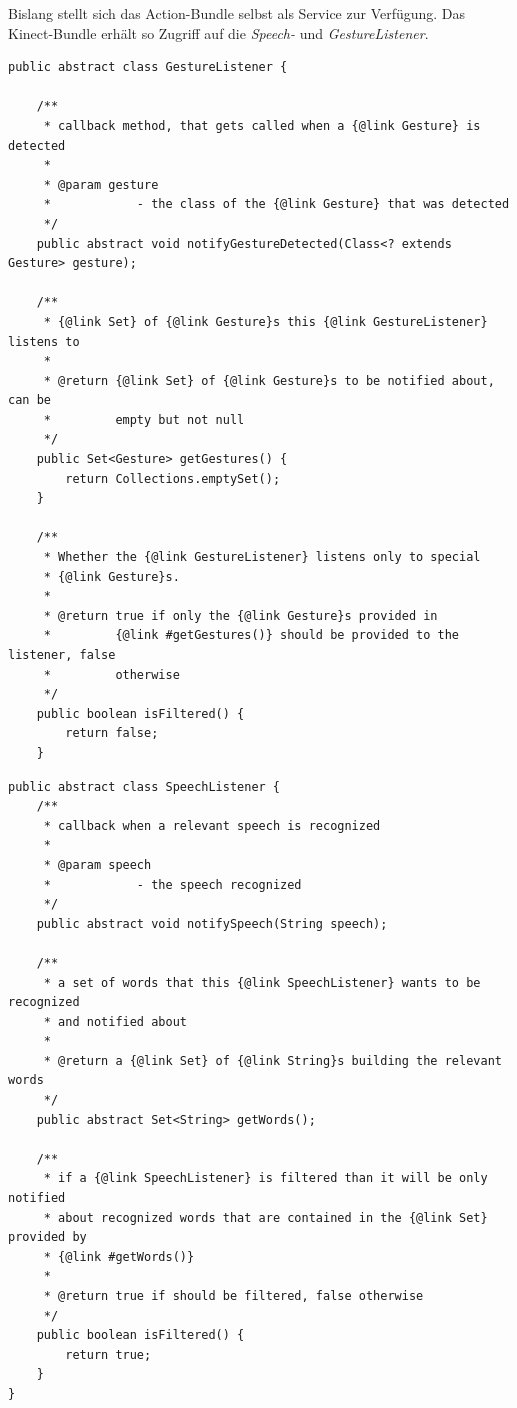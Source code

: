 Bislang stellt sich das Action-Bundle selbst als Service zur Verf\"ugung. Das Kinect-Bundle erh\"alt so Zugriff auf die \textit{Speech-} und 
\textit{GestureListener}.


\par\smallskip
\lstset{language=Java}

\begin{lstlisting}[caption={Klasse GestureListener}, label={listing:GestureListener}]
public abstract class GestureListener {

	/**
	 * callback method, that gets called when a {@link Gesture} is detected
	 * 
	 * @param gesture
	 *            - the class of the {@link Gesture} that was detected
	 */
	public abstract void notifyGestureDetected(Class<? extends Gesture> gesture);

	/**
	 * {@link Set} of {@link Gesture}s this {@link GestureListener} listens to
	 * 
	 * @return {@link Set} of {@link Gesture}s to be notified about, can be
	 *         empty but not null
	 */
	public Set<Gesture> getGestures() {
		return Collections.emptySet();
	}

	/**
	 * Whether the {@link GestureListener} listens only to special
	 * {@link Gesture}s.
	 * 
	 * @return true if only the {@link Gesture}s provided in
	 *         {@link #getGestures()} should be provided to the listener, false
	 *         otherwise
	 */
	public boolean isFiltered() {
		return false;
	}
\end{lstlisting}
\par\smallskip

\par\smallskip
\lstset{language=Java}

\begin{lstlisting}[caption={Klasse SpeechListener}, label={listing:SpeechListener}]
public abstract class SpeechListener {
	/**
	 * callback when a relevant speech is recognized
	 * 
	 * @param speech
	 *            - the speech recognized
	 */
	public abstract void notifySpeech(String speech);

	/**
	 * a set of words that this {@link SpeechListener} wants to be recognized
	 * and notified about
	 * 
	 * @return a {@link Set} of {@link String}s building the relevant words
	 */
	public abstract Set<String> getWords();

	/**
	 * if a {@link SpeechListener} is filtered than it will be only notified
	 * about recognized words that are contained in the {@link Set} provided by
	 * {@link #getWords()}
	 * 
	 * @return true if should be filtered, false otherwise
	 */
	public boolean isFiltered() {
		return true;
	}
}
\end{lstlisting}
\par\smallskip

